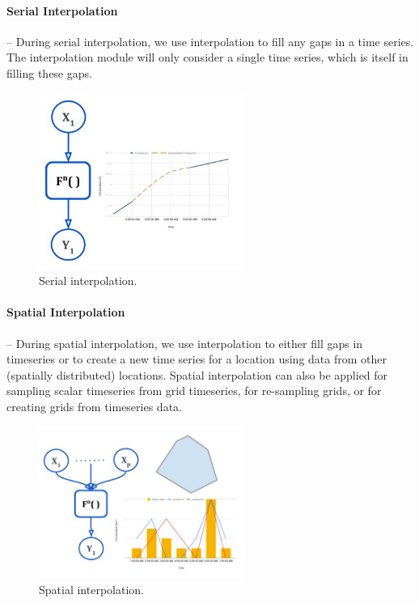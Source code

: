 \paragraph{Serial Interpolation}-- During serial interpolation, we use interpolation to fill any gaps in a time series. The interpolation module will only consider a single time series, which is itself in filling these gaps.

\begin{figure}[htp]
    \centering
    \includegraphics[width=0.6\textwidth]{method/data_preprocess/serial_interpolation.jpg}
    \caption{Serial interpolation.}
    \label{fi:serial_interpolation}
\end{figure}

\paragraph{Spatial Interpolation}-- During spatial interpolation, we use interpolation to either fill gaps in timeseries or to create a new time series for a location using data from other (spatially distributed) locations. Spatial interpolation can also be applied for sampling scalar timeseries from grid timeseries, for re-sampling grids, or for creating grids from timeseries data.
\begin{figure}[htp]
    \centering
    \includegraphics[width=0.6\textwidth]{method/data_preprocess/spatial_interpolation.jpg}
    \caption{Spatial interpolation.}
    \label{fi:spatial_interpolation}
\end{figure}

